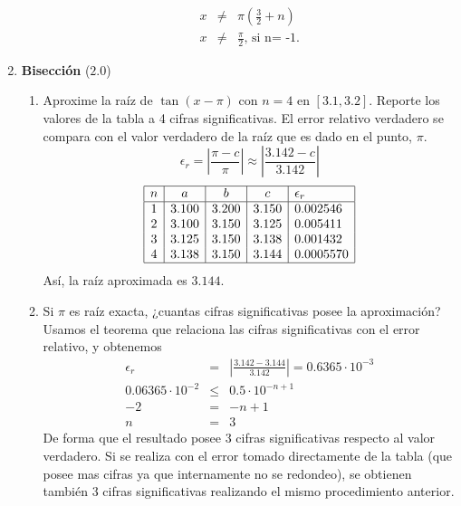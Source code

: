 \documentclass[12pt]{article}
\begin{document}
\begin{enumerate}[leftmargin=*,widest=9]
\begin{enumerate}[label=\alph*]
\begin{eqnarray*}
   x & \neq & \pi \left(\frac{3}{2} + n \right) \\
   x & \neq & \frac{\pi}{2} \text{, si n= -1.}
   \end{eqnarray*}
    \end{enumerate}
    \item \textbf{Bisección} ($2.0$)
    \begin{enumerate}[label=\alph*]
    \item Aproxime la raíz de $\tan (x - \pi)$ con $n=4$ en $\left[3.1, 3.2\right]$. Reporte los valores de la tabla a 4 cifras significativas.
    El error relativo verdadero se compara con el valor verdadero de la raíz que es dado en el punto, $\pi$.
    \[ \epsilon_r = \left| \frac{\pi - c}{\pi} \right| \approx \left|\frac{3.142 - c}{3.142} \right| \]
    \[
    \begin{array}{|c|c|c|c|l|}
    \hline
    n & a & b & c & \epsilon_r \\
    \hline
    1 &  3.100  & 3.200 & 3.150 & 0.002546 \\
 2 &  3.100 & 3.150 & 3.125 & 0.005411 \\
 3 & 3.125 & 3.150 & 3.138 & 0.001432 \\
 4 & 3.138 & 3.150 & 3.144 & 0.0005570 \\
    \hline
    \end{array}
    \]
    Así, la raíz aproximada es $3.144$.
    \item Si $\pi$ es raíz exacta, ¿cuantas cifras significativas posee la aproximación?
    Usamos el teorema que relaciona las cifras significativas con el error relativo, y obtenemos
    \begin{eqnarray*}
    \epsilon_r  & = & \left| \frac{3.142 - 3.144}{3.142} \right| = 0.6365\cdot 10^{-3}  \\
    0.06365\cdot 10^{-2} & \leq & 0.5 \cdot 10^{-n + 1} \\
    -2 & = & -n + 1 \\
    n & = & 3
    \end{eqnarray*}
    De forma que el resultado posee 3 cifras significativas respecto al valor verdadero. Si se realiza con el error tomado directamente de la tabla (que posee mas cifras ya que internamente no se redondeo), se obtienen también 3 cifras significativas realizando el mismo procedimiento anterior.
    \end{enumerate}
  \end{enumerate}
\end{document}
